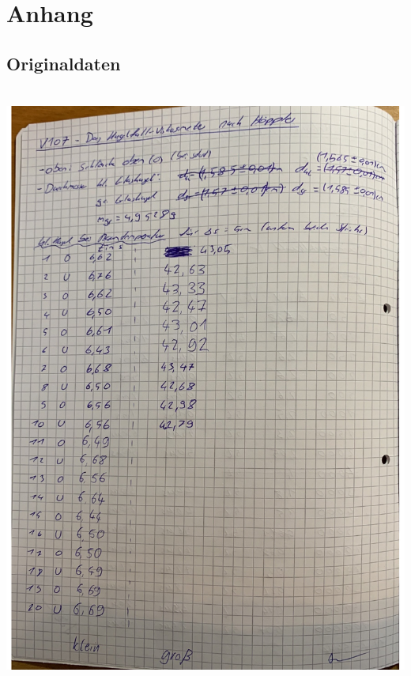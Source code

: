 \section{Anhang}
\label{sec:Anhang}
\subsection{Originaldaten}
\includegraphics[height=20cm]{content/Originaldaten.pdf}
\newpage
